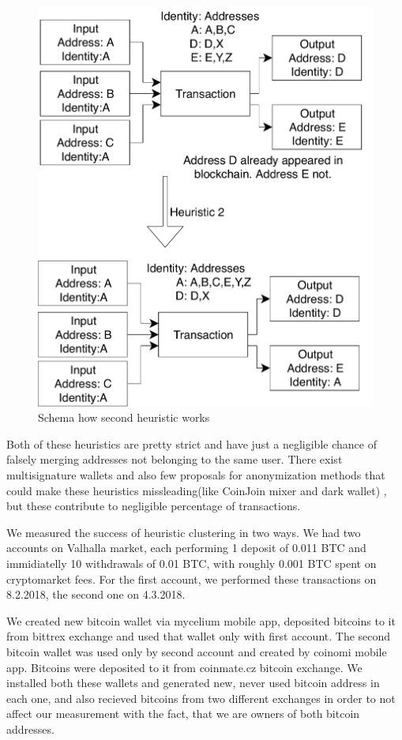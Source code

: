 \documentclass[
  digital, %
  table,   %
  lof,     %
  lot,     %
  oneside
]{fithesis3}
\begin{document}
\begin{figure}[!htb]
    \centering
    \includegraphics[width=1\textwidth]{heur2}
    \caption{Schema how second heuristic works}
    \label{heur2}
\end{figure}

Both of these heuristics are pretty strict and have just a negligible chance of falsely merging
addresses not belonging to the same user\parencite{androulaki2013evaluating}.
There exist multisignature wallets and also few proposals for anonymization methods that could make
these heuristics missleading(like CoinJoin mixer and dark wallet) 
, but these contribute to negligible percentage of transactions.

We measured the success of heuristic clustering in two ways.
We had two accounts on Valhalla market, each performing 1 deposit of 0.011 BTC and immidiatelly 10 withdrawals of
0.01 BTC, with roughly 0.001 BTC spent on cryptomarket fees.
For the first account, we performed these transactions on 8.2.2018, the second one on 4.3.2018.

We created new bitcoin wallet via mycelium mobile app, deposited bitcoins to it
from bittrex exchange and used that wallet only with first account.
The second bitcoin wallet was used only by second account and created by coinomi mobile app. 
Bitcoins were deposited to it from coinmate.cz bitcoin exchange.
We installed both these wallets and generated new, never used bitcoin address in each one, and also
recieved bitcoins from two different exchanges in order to not affect
our measurement with the fact, that we are owners of both bitcoin addresses.
\end{document}
